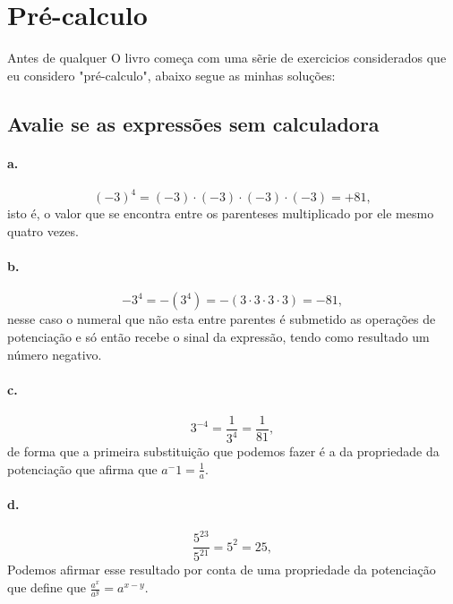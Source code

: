 \documentclass{article}
\begin{document}
\section{Pré-calculo}
Antes de qualquer O livro começa com uma sẽrie de exercicios considerados que eu considero "pré-calculo", abaixo segue as minhas soluções:



\subsection{Avalie se as expressões sem calculadora}

	\paragraph{a.}
	\begin{equation}
	(-3)^4 = (-3)\cdot(-3)\cdot(-3)\cdot(-3) = +81,
	\end{equation}
	 isto é, o valor que se encontra entre os parenteses multiplicado por ele mesmo quatro vezes.

	\paragraph{b.}
	\begin{equation}
	-3^4 = -(3^4) = -(3\cdot3\cdot3\cdot3) = -81,
	\end{equation}
	 nesse caso o numeral que não esta entre parentes é submetido as operações de potenciação e só então recebe o sinal da expressão, tendo como resultado um número negativo.

	\paragraph{c.}
	\begin{equation}
	3^{-4} = \frac{1}{3^4} = \frac{1}{81},
	\end{equation}
	 de forma que a primeira substituição que podemos fazer é a da propriedade da potenciação que afirma que $a^-1 = \frac{1}{a}$.

	\paragraph{d.}
	\begin{equation}
	\frac{5^{23}}{5^{21}} = 5^2 = 25,
	\end{equation}
	Podemos afirmar esse resultado por conta de uma propriedade da potenciação que define que $\frac{a^x}{a^y} = a^{x-y}$.
\end{document}
